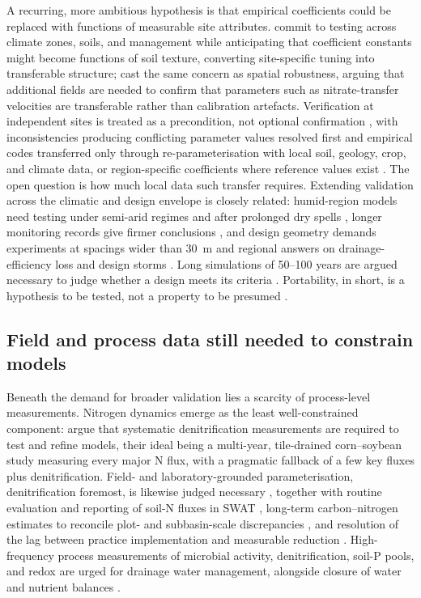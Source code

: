 \documentclass[11pt]{article}
\begin{document}
A recurring, more ambitious hypothesis is that empirical coefficients could be
replaced with functions of measurable site attributes. \textcite{Li2006} commit
to testing across climate zones, soils, and management while anticipating that
coefficient constants might become functions of soil texture, converting
site-specific tuning into transferable structure; \textcite{Chelil2022} cast the
same concern as spatial robustness, arguing that additional fields are needed to
confirm that parameters such as nitrate-transfer velocities are transferable
rather than calibration artefacts. Verification at independent sites is treated
as a precondition, not optional confirmation
\parencite{Azevedo1997,Qi2015,Kalita1998,Sadhukhan2019b}, with inconsistencies
producing conflicting parameter values resolved first \parencite{Dar2022} and
empirical codes transferred only through re-parameterisation with local soil,
geology, crop, and climate data, or region-specific coefficients where reference
values exist \parencite{Azevedo1997,FathAllah2025,Rijal2013}. The open question
is how much local data such transfer requires. Extending validation across the
climatic and design envelope is closely related: humid-region models need
testing under semi-arid regimes and after prolonged dry spells
\parencite{Prasher1996}, longer monitoring records give firmer conclusions
\parencite{Ebrahimian2011,Grazhdani1996}, and design geometry demands
experiments at spacings wider than 30~m and regional answers on
drainage-efficiency loss and design storms
\parencite{Mathew2001,Wiskow2003,MULLER1988}. Long simulations of 50--100 years
are argued necessary to judge whether a design meets its criteria
\parencite{Mendez2004,Wang2006b,Ale2009,Häggblom2019}. Portability, in short, is
a hypothesis to be tested, not a property to be presumed
\parencite{Hornbuckle2012,Shipitalo2016,Yousfi2014}.

\subsection{Field and process data still needed to constrain models}

Beneath the demand for broader validation lies a scarcity of process-level
measurements. Nitrogen dynamics emerge as the least well-constrained component:
\textcite{David2009} argue that systematic denitrification measurements are
required to test and refine models, their ideal being a multi-year,
tile-drained corn--soybean study measuring every major N flux, with a pragmatic
fallback of a few key fluxes plus denitrification. Field- and
laboratory-grounded parameterisation, denitrification foremost, is likewise
judged necessary \parencite{Salazar2009}, together with routine evaluation and
reporting of soil-N fluxes in SWAT \parencite{Ikenberry2017}, long-term
carbon--nitrogen estimates to reconcile plot- and subbasin-scale discrepancies
\parencite{Singer2011}, and resolution of the lag between practice
implementation and measurable reduction \parencite{Law2022,Tao2021}.
High-frequency process measurements of microbial activity, denitrification,
soil-P pools, and redox are urged for drainage water management, alongside
closure of water and nutrient balances \parencite{Frankenberger2024,Sharpley2019}.
\end{document}
